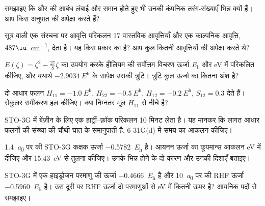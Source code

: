 \begin{exercise}[$\star$]\label{exo:b3:computational-chemistry:3}
समझाइए कि  और  की आबंध लंबाई और  समान होते हुए भी उनकी कंपनिक तरंग-संख्याएँ भिन्न क्यों हैं। आप किस अनुपात की अपेक्षा करते हैं?
\end{exercise}

\begin{exercise}[$\star$]\label{exo:b3:computational-chemistry:4}
सूत्र  वाली एक संरचना पर आवृत्ति परिकलन 17 वास्तविक
आवृत्तियाँ और एक काल्पनिक आवृत्ति, $487\iu$~\unit{cm^{-1}}, देता है। यह किस प्रकार का
 है? आप कुल कितनी आवृत्तियों की अपेक्षा करते थे?
\end{exercise}

\begin{exercise}[$\star\star$]\label{exo:b3:computational-chemistry:5}
$E(\zeta) = \zeta^2 - \frac{27}{8}\zeta$ का उपयोग करके हीलियम की सर्वोत्तम विचरण
ऊर्जा \unit{\hartree} और eV में परिकलित कीजिए, और यथार्थ
$\qty{-2.9034}{\hartree}$ के सापेक्ष उसकी त्रुटि। त्रुटि कुल ऊर्जा का कितना अंश है?
\end{exercise}

\begin{exercise}[$\star\star$]\label{exo:b3:computational-chemistry:6}
दो आधार फलन $H_{11} = \qty{-1.0}{\hartree}$, $H_{22} =
\qty{-0.5}{\hartree}$, $H_{12} = \qty{-0.2}{\hartree}$, $S_{12} = 0.3$ देते हैं।
सेकुलर समीकरण हल कीजिए। क्या निम्नतर मूल $H_{11}$ से नीचे है?
\end{exercise}

\begin{exercise}[$\star\star$]\label{exo:b3:computational-chemistry:7}
STO-3G में बेंज़ीन के लिए एक हार्ट्री--फ़ॉक परिकलन 10 मिनट लेता है। यह मानकर कि
लागत आधार फलनों की संख्या की चौथी घात के समानुपाती है,
6-31G(d) में समय का आकलन कीजिए।
\end{exercise}

\begin{exercise}[$\star\star$]\label{exo:b3:computational-chemistry:8}
\qty{1.4}{\bohr} पर  की STO-3G कक्षक ऊर्जा
\qty{-0.5782}{\hartree} है। आयनन ऊर्जा का कूपमान्स आकलन eV में दीजिए
और \qty{15.43}{eV} से तुलना कीजिए। उनके भिन्न होने के दो कारण और उनकी
दिशाएँ बताइए।
\end{exercise}

\begin{exercise}[$\star\star$]\label{exo:b3:computational-chemistry:9}
STO-3G में एक हाइड्रोजन परमाणु की ऊर्जा \qty{-0.4666}{\hartree} है और \qty{10}{\bohr} पर
 की RHF ऊर्जा \qty{-0.5960}{\hartree} है। उस दूरी पर RHF ऊर्जा
दो परमाणुओं से eV में कितनी ऊपर है? आयनिक
पदों से समझाइए।
\end{exercise}

